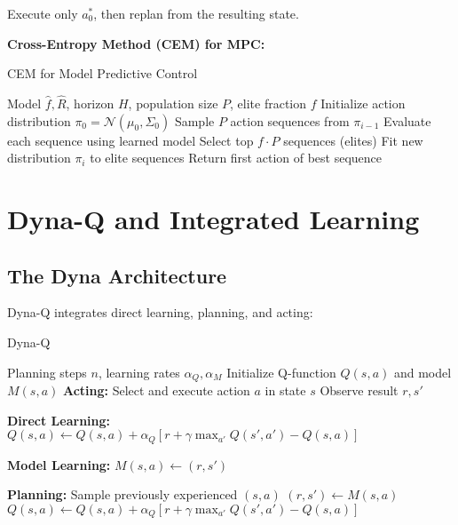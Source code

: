 Execute only $a_0^*$, then replan from the resulting state.

\textbf{Cross-Entropy Method (CEM) for MPC:}
\begin{algorithm}
\caption{CEM for Model Predictive Control}
\begin{algorithmic}
\REQUIRE Model $\hat{f}, \hat{R}$, horizon $H$, population size $P$, elite fraction $f$
\STATE Initialize action distribution $\pi_0 = \mathcal{N}(\mu_0, \Sigma_0)$
    \STATE Sample $P$ action sequences from $\pi_{i-1}$
    \STATE Evaluate each sequence using learned model
    \STATE Select top $f \cdot P$ sequences (elites)
    \STATE Fit new distribution $\pi_i$ to elite sequences
\ENDFOR
\STATE Return first action of best sequence
\end{algorithmic}
\end{algorithm}

\section{Dyna-Q and Integrated Learning}

\subsection{The Dyna Architecture}

Dyna-Q integrates direct learning, planning, and acting:

\begin{algorithm}
\caption{Dyna-Q}
\begin{algorithmic}
\REQUIRE Planning steps $n$, learning rates $\alpha_Q, \alpha_M$
\STATE Initialize Q-function $Q(s,a)$ and model $M(s,a)$
    \STATE \textbf{Acting:} Select and execute action $a$ in state $s$
    \STATE Observe result $r, s'$
    
    \STATE \textbf{Direct Learning:} $Q(s,a) \leftarrow Q(s,a) + \alpha_Q[r + \gamma \max_{a'} Q(s',a') - Q(s,a)]$
    
    \STATE \textbf{Model Learning:} $M(s,a) \leftarrow (r, s')$
    
    \STATE \textbf{Planning:} 
        \STATE Sample previously experienced $(s, a)$
        \STATE $(r, s') \leftarrow M(s, a)$
        \STATE $Q(s,a) \leftarrow Q(s,a) + \alpha_Q[r + \gamma \max_{a'} Q(s',a') - Q(s,a)]$
    \ENDFOR
\ENDFOR
\end{algorithmic}
\end{algorithm}

